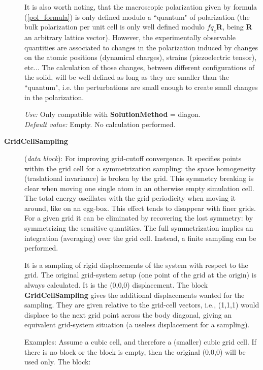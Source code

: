\documentclass[11pt]{article}
\begin{document}
\begin{description}
It is also worth noting, that the macroscopic polarization given by
formula (\ref{pol_formula}) is only defined modulo a ``quantum" of
polarization (the bulk polarization per unit cell is only well defined
modulo $fq_e${\bf R}, being {\bf R} an arbitrary lattice
vector). However, the experimentally observable quantities are
associated to changes in the polarization induced by changes on the
atomic positions (dynamical charges), strains (piezoelectric tensor),
etc... The calculation of those changes, between different
configurations of the solid, will be well defined as long as they are
smaller than the ``quantum", i.e. the perturbations are small enough
to create small changes in the polarization.

{\it Use:} Only compatible with {\bf SolutionMethod} = diagon.\\
{\it Default value:} Empty. No calculation performed.



\item[{\bf GridCellSampling}] ({\it data block}): 
For improving grid-cutoff convergence. It specifies points within
the grid cell for a symmetrization sampling: the space 
homogeneity (traslational invariance)
is broken by the grid. This symmetry breaking is clear
when moving one single atom in an otherwise empty simulation cell.
The total energy oscillates with the grid periodicity when moving
it around, like on an egg-box. This effect tends to disappear with 
finer grids. For a given grid it can be eliminated
by recovering the lost symmetry: by symmetrizing the sensitive
quantities. The full symmetrization implies an integration (averaging)
over the grid cell. Instead, a finite sampling can be performed.

It is a sampling of rigid displacements of the system with respect
to the grid. The original grid-system setup (one point of the grid
at the origin) is always calculated. It is the (0,0,0) displacement. 
The block {\bf GridCellSampling} gives the additional displacements
wanted for the sampling. They are given relative to the grid-cell 
vectors, i.e., (1,1,1) would displace to the next grid point across
the body diagonal, giving an equivalent grid-system situation
(a useless displacement for a sampling).

Examples: Assume a cubic cell, and therefore a (smaller) cubic grid cell.
If there is no block or the block is empty, then the original (0,0,0)
will be used only. The block: 


\end{description}
\end{document}
